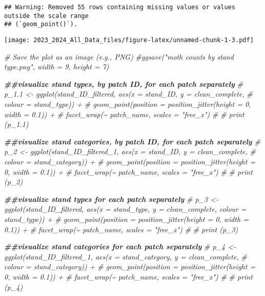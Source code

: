 \documentclass[
]{article}
\newenvironment{Shaded}{\begin{snugshade}}{\end{snugshade}}
\newcommand{\CommentTok}[1]{\textcolor[rgb]{0.56,0.35,0.01}{\textit{#1}}}
\newcommand{\DocumentationTok}[1]{\textcolor[rgb]{0.56,0.35,0.01}{\textbf{\textit{#1}}}}
\begin{document}
\begin{verbatim}
## Warning: Removed 55 rows containing missing values or values outside the scale range
## (`geom_point()`).
\end{verbatim}

\texttt{[image: 2023\_2024\_All\_Data\_files/figure-latex/unnamed-chunk-1-3.pdf]}

\begin{Shaded}
\begin{Highlighting}[]
\CommentTok{\# Save the plot as an image (e.g., PNG)}
\CommentTok{\#ggsave("moth counts by stand type.png", width = 9, height = 7)}

\DocumentationTok{\#\#visualize stand types, by patch ID, for each patch separately}
\CommentTok{\# p\_1.1 \textless{}{-} ggplot(stand\_ID\_filtered, aes(x = stand\_ID, y = clean\_complete, }
\CommentTok{\#                                      colour = stand\_type)) +}
\CommentTok{\#   geom\_point(position = position\_jitter(height = 0, width = 0.1)) + }
\CommentTok{\#   facet\_wrap(\textasciitilde{} patch\_name, scales = "free\_x")}
\CommentTok{\# }
\CommentTok{\# print (p\_1.1)}


\DocumentationTok{\#\#visualize stand categories, by patch ID, for each patch separately}
\CommentTok{\# p\_2 \textless{}{-} ggplot(stand\_ID\_filtered\_1, aes(x = stand\_ID, y = clean\_complete, }
\CommentTok{\#                                        colour = stand\_category)) +}
\CommentTok{\#   geom\_point(position = position\_jitter(height = 0, width = 0.1)) + }
\CommentTok{\#   facet\_wrap(\textasciitilde{} patch\_name, scales = "free\_x")}
\CommentTok{\# }
\CommentTok{\# print (p\_2)}

\DocumentationTok{\#\#visualize stand types for each patch separately}
\CommentTok{\# p\_3 \textless{}{-} ggplot(stand\_ID\_filtered, aes(x = stand\_type, y = clean\_complete, colour = stand\_type)) +}
\CommentTok{\#   geom\_point(position = position\_jitter(height = 0, width = 0.1)) + }
\CommentTok{\#   facet\_wrap(\textasciitilde{} patch\_name, scales = "free\_x")}
\CommentTok{\# }
\CommentTok{\# print (p\_3)}

\DocumentationTok{\#\#visualize stand categories for each patch separately}
\CommentTok{\# p\_4 \textless{}{-} ggplot(stand\_ID\_filtered\_1, aes(x = stand\_category, y = clean\_complete, }
\CommentTok{\#                                        colour = stand\_category)) +}
\CommentTok{\#   geom\_point(position = position\_jitter(height = 0, width = 0.1)) + }
\CommentTok{\#   facet\_wrap(\textasciitilde{} patch\_name, scales = "free\_x")}
\CommentTok{\# }
\CommentTok{\# print (p\_4)}



\end{Highlighting}
\end{Shaded}
\end{document}

